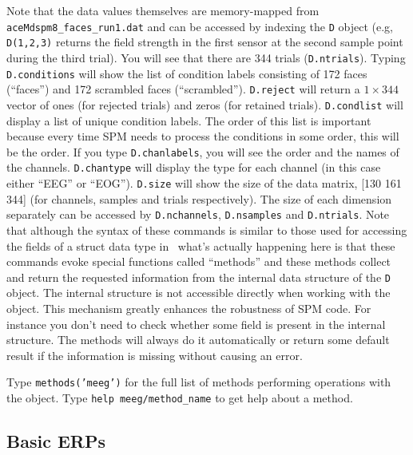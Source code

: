 Note that the data values themselves are memory-mapped from \verb!aceMdspm8_faces_run1.dat! and can be accessed by indexing the \texttt{D} object (e.g, \texttt{D(1,2,3)} returns the field strength in the first sensor at the second sample point during the third trial). You will see that there are 344 trials (\texttt{D.ntrials}). Typing \texttt{D.conditions} will show the list of condition labels consisting of 172 faces (``faces'') and 172 scrambled faces (``scrambled''). \texttt{D.reject} will return a $1\times 344$ vector of ones (for rejected trials) and zeros (for retained trials). \texttt{D.condlist} will display a list of unique condition labels. The order of this list is important because every time SPM needs to process the conditions in some order, this will be the order. If you type \texttt{D.chanlabels}, you will see the order and the names of the channels. \texttt{D.chantype} will display the type for each channel (in this case either ``EEG'' or ``EOG''). \texttt{D.size} will show the size of the data matrix, [130 161 344] (for channels, samples and trials respectively). The size of each dimension separately can be accessed by \texttt{D.nchannels}, \texttt{D.nsamples} and \texttt{D.ntrials}. Note that although the syntax of these commands is similar to those used for accessing the fields of a struct data type in \matlab\, what's actually happening here is that these commands evoke special functions called ``methods'' and these methods  collect and return the requested information from the internal data structure of the \texttt{D} object. The internal structure is not accessible directly when working with the object. This mechanism greatly enhances the robustness of SPM code. For instance you don't need to check whether some field is present in the internal structure. The methods will always do it automatically or return some default result if the information is missing without causing an error.

Type \texttt{methods('meeg')} for the full list of methods performing operations with the object. Type \texttt{help meeg/method\_name} to get help about a method.


\subsection{Basic ERPs}

